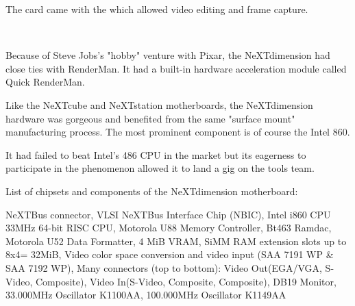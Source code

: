 \par
\vspace{-5pt}
The card came with the  which allowed video editing and frame capture.
\par
\vspace{3pt}
\\
\par
Because of Steve Jobs's "hobby" venture with Pixar, the NeXTdimension had close ties with RenderMan. It had a built-in hardware acceleration module called Quick RenderMan.\\
\par
\par






\par
Like the NeXTcube and NeXTstation motherboards, the NeXTdimension hardware was gorgeous and benefited from the same "surface mount" manufacturing process. The most prominent component is of course the Intel 860.\\
\par It had failed to beat Intel's 486 CPU in the market but its eagerness to participate in the \doom{} phenomenon allowed it to land a gig on the tools team.\\
\par
{}
\par
{}
\par
List of chipsets and components of the NeXTdimension motherboard:\\
\par 
{} NeXTBus connector,
 VLSI NeXTBus Interface Chip (NBIC),
 Intel i860 CPU 33MHz 64-bit RISC CPU,
 Motorola U88 Memory Controller,
 Bt463 Ramdac,
 Motorola U52 Data Formatter,
 4 MiB VRAM,
 SiMM RAM extension slots up to 8x4= 32MiB,
 Video color space conversion and video input (SAA 7191 WP \& SAA 7192 WP), 
 Many connectors (top to bottom): Video Out(EGA/VGA, S-Video, Composite), Video In(S-Video, Composite, Composite), DB19 Monitor,
 33.000MHz Oscillator K1100AA,
 100.000MHz Oscillator K1149AA
\par

